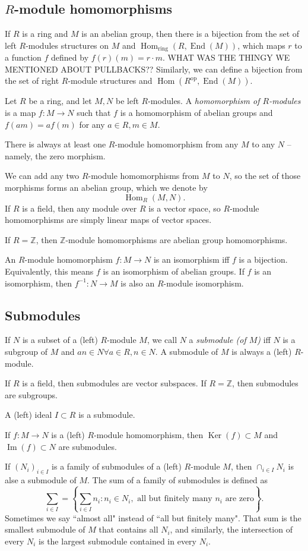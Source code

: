 \documentclass[12pt]{article}
\begin{document}
\subsection{$R$-module homomorphisms}
If $R$ is a ring and $M$ is an abelian group, then there is a bijection from the set of left $R$-modules structures on $M$ and $\operatorname{Hom}_\mathrm{ring}(R, \operatorname{End}(M))$, which maps $r$ to a function $f$ defined by $f(r)(m)=r \cdot m$. WHAT WAS THE THINGY WE MENTIONED ABOUT PULLBACKS?? Similarly, we can define a bijection from the set of right $R$-module structures and $\operatorname{Hom}(R^\mathrm{op}, \operatorname{End}(M))$.
\par
Let $R$ be a ring, and let $M,N$ be left $R$-modules. A \textit{homomorphism of $R$-modules} is a map $f: M \rightarrow N$ such that $f$ is a homomorphism of abelian groups and $f(am)=af(m)$ for any $a \in R, m \in M$.
\par
There is always at least one $R$-module homomorphism from any $M$ to any $N$ -- namely, the zero morphism.
\par
We can add any two $R$-module homomorphisms from $M$ to $N$, so the set of those morphisms forms an abelian group, which we denote by
\[ \operatorname{Hom}_R(M,N). \]
If $R$ is a field, then any module over $R$ is a vector space, so $R$-module homomorphisms are simply linear maps of vector spaces.
\par
If $R=\mathbb{Z}$, then $\mathbb{Z}$-module homomorphisms are abelian group homomorphisms.
\par
An $R$-module homomorphism $f: M \rightarrow N$ is an isomorphism iff $f$ is a bijection. Equivalently, this means $f$ is an isomorphism of abelian groups. If $f$ is an isomorphism, then $f^{-1}: N\rightarrow M$ is also an $R$-module isomorphism.
\subsection{Submodules}
If $N$ is a subset of a (left) $R$-module $M$, we call $N$ a \textit{submodule (of $M$)} iff $N$ is a subgroup of $M$ and $an \in N \forall a \in R, n \in N$. A submodule of $M$ is always a (left) $R$-module.
\par
If $R$ is a field, then submodules are vector subspaces. If $R=\mathbb{Z}$, then submodules are subgroups.
\par
A (left) ideal $I \subset R$ is a submodule.
\par
If $f: M\rightarrow N$ is a (left) $R$-module homomorphism, then $\operatorname{Ker}(f) \subset M$ and $\operatorname{Im}(f) \subset N$ are submodules.
\par
If $(N_i)_{i \in I}$ is a family of submodules of a (left) $R$-module $M$, then $\cap_{i \in I} N_i$ is alse a submodule of $M$. The sum of a family of submodules is defined as
\[ \sum_{i \in I} = \left\{ \sum_{i \in I} n_i: n_i \in N_i, \text{ all but finitely many $n_i$ are zero} \right\}. \]
Sometimes we say ``almost all" instead of ``all but finitely many". That sum is the smallest submodule of $M$ that contains all $N_i$, and similarly, the intersection of every $N_i$ is the largest submodule contained in every $N_i$.
\end{document}

